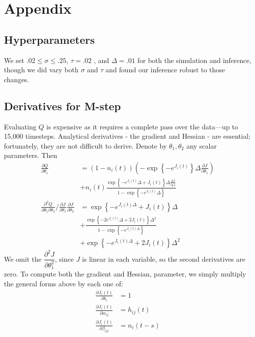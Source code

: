 \documentclass{article}
\begin{document}
\begin{small}

 
\end{small}

\section*{Appendix}
\subsection{Hyperparameters}
We set $.02 \leq \sigma \leq .25$, $\tau = .02$ \citep{gerstner2002}, and $\Delta = .01$ for both the simulation and inference, though we did vary both $\sigma$ and $\tau$ and found our inference robust to those changes.
\subsection{Derivatives for M-step}
Evaluating $Q$ is expensive as it requires a complete pass over the
data---up to 15,000 timesteps. Analytical derivatives - the gradient and Hessian - are essential;
fortunately, they are not difficult to derive. Denote by
$\theta_1, \theta_2$ any scalar parameters. Then
\begin{align*}
\frac{\partial Q}{\partial \theta_1} &= \left(1 - n_i(t)\right) \left(-\exp{\left\{-e^{J_i(t)}\right\}} \Delta \frac{\partial J}{\partial \theta_1}\right) \\
    &+ n_i(t) \frac{\exp{ \left\{ -e^{J_i(t)} \Delta + J_i(t) \right\}} \Delta \frac{\partial J}{\partial_\theta1} }{1 - \exp{\left\{-e^{J_i(t)}\Delta\right\}}} \\
\frac{\partial^2 Q}{\partial \theta_1 \partial \theta_2} / \frac{\partial J}{\partial \theta_1} \frac{\partial J}{\partial \theta_2} &= \exp{\left\{-e^{J_i(t)\Delta} + J_i(t)\right\}}\Delta \\
 &+ \frac{\exp{\left\{-2e^{J_i(t)}\Delta + 2J_i(t)\right\}}\Delta^2}{1 - \exp{\left\{-e^{J_i(t)\Delta}\right\}}} \\
 &+ \exp{\left\{-e^{J_i(t)\Delta} + 2J_i(t)\right\}} \Delta^2 
\end{align*}
We omit the $\dfrac{\partial^2 J}{\partial \theta_1^2}$, since $J$
is linear in each variable, so the second derivatives are zero. To
compute both the gradient and Hessian, parameter, we simply multiply
the general forms above by each one of:
\begin{align}
\frac{\partial J_i(t)}{\partial b_i}         &= 1 \\
\frac{\partial J_i(t)}{\partial w_{ij}}      &= h_{ij}(t) \\
\frac{\partial J_i(t)}{\partial \beta_{ijs}} &= n_i(t - s)
\end{align}
\end{document}
